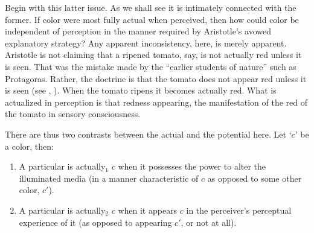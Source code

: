 Begin with this latter issue. As we shall see it is intimately connected with the former. If color were most fully actual when perceived, then how could color be independent of perception in the manner required by Aristotle's avowed explanatory strategy? Any apparent inconsistency, here, is merely apparent. Aristotle is not claiming that a ripened tomato, say, is not actually red unless it is seen. That was the mistake made by the ``earlier students of nature'' such as Protagoras. Rather, the doctrine is that the tomato does not appear red unless it is seen (see \citealt[29]{Burnyeat:1982mz}, \citealt{Ganson:1997fk}). When the tomato ripens it becomes actually red. What is actualized in perception is that redness appearing, the manifestation of the red of the tomato in sensory consciousness. 

There are thus two contrasts between the actual and the potential here. Let `\( c \)' be a color, then:
\begin{enumerate}[(1)]
	\item A particular is actually\( _{1} \) \( c \) when it possesses the power to alter the illuminated media (in a manner characteristic of \( c \) as opposed to some other color, \( c' \)).
	\item A particular is actually\( _{2} \) \( c \) when it appears \( c \) in the perceiver's perceptual experience of it (as opposed to appearing \( c' \), or not at all).
\end{enumerate}

